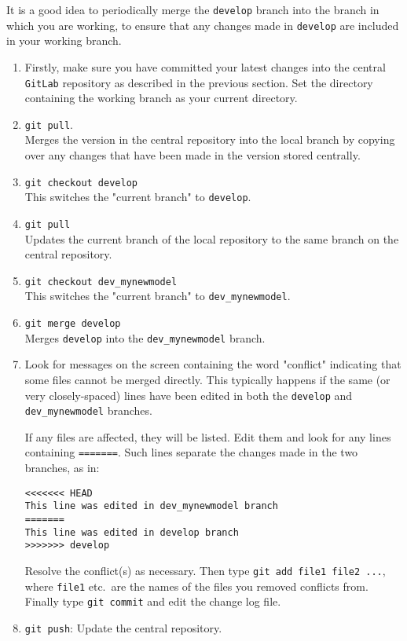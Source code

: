 \documentclass[11pt,a4paper]{report}
\begin{document}
It is a good idea to periodically merge the \texttt{develop} branch into the branch in which you are working, to ensure that any changes made in \texttt{develop} are included in your working branch.
\begin{enumerate}

\item Firstly, make sure you have committed your latest changes into the
  central \texttt{GitLab} repository as described in the previous section.  Set the directory containing the working branch as your current directory.

\item \texttt{git pull}.  \\
Merges the version in the central repository into the local branch by copying over any changes that have been made in the version stored centrally.

\item \texttt{git checkout develop}  \\
This switches the "current branch" to \texttt{develop}.

\item \texttt{git pull} \\
Updates the current branch of the local repository to the same branch on the central repository.

\item \texttt{git checkout dev\_mynewmodel}  \\
This switches the "current branch" to \texttt{dev\_mynewmodel}.

\item \texttt{git merge develop} \\
Merges \texttt{develop} into the \texttt{dev\_mynewmodel} branch.

\item Look for messages on the screen containing the word "conflict" indicating that some files cannot be merged directly. This typically happens if the
  same (or very closely-spaced) lines have been edited in both the
  \texttt{develop} and \texttt{dev\_mynewmodel} branches.

  If any files are affected, they will be listed.  Edit them and look for any lines containing  \texttt{=======}. Such lines separate the changes made in the two branches, as in:
\begin{verbatim}
<<<<<<< HEAD
This line was edited in dev_mynewmodel branch
=======
This line was edited in develop branch
>>>>>>> develop
\end{verbatim}
  Resolve the conflict(s) as necessary. Then type \texttt{git add file1 file2 ...}, where
  \texttt{file1} etc.\ are the names of the files you removed conflicts
  from. Finally type \texttt{git commit} and edit the change log file.

\item \texttt{git push}: Update the central repository.

\end{enumerate}
\end{document}
